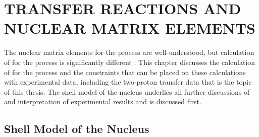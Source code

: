 %
%
%
%
%
%
%
%

%
%

\chapter{TRANSFER REACTIONS AND NUCLEAR MATRIX ELEMENTS}
\label{chap:nucl}

The nuclear matrix elements for the \tvbb process are well-understood, but calculation of \NME for the \zvbb process is significantly different \citep{VogelReview}.  This chapter discusses the calculation of \NME for the \zvbb process and the constraints that can be placed on these calculations with experimental data, including the two-proton transfer data that is the topic of this thesis.  The shell model of the nucleus underlies all further discussions of \NME and interpretation of experimental results and is discussed first.    

\section{Shell Model of the Nucleus}

